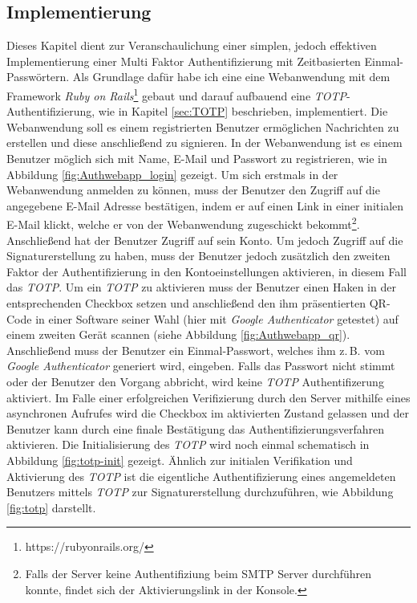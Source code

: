 \documentclass[11pt,a4paper,ngerman]{scrreprt}
\begin{document}
\subsection{Implementierung}\label{sec:TOTPImpl}
Dieses Kapitel dient zur Veranschaulichung einer simplen, jedoch effektiven Implementierung einer Multi Faktor Authentifizierung mit Zeitbasierten Einmal-Passwörtern. Als Grundlage dafür habe ich eine eine Webanwendung mit dem Framework \textit{Ruby on Rails}\footnote{https://rubyonrails.org/} gebaut und darauf aufbauend eine \textit{TOTP}-Authentifizierung, wie in Kapitel \ref{sec:TOTP} beschrieben, implementiert. Die Webanwendung soll es einem registrierten Benutzer ermöglichen Nachrichten zu erstellen und diese anschließend zu signieren. In der Webanwendung ist es einem Benutzer möglich sich mit Name, E-Mail und Passwort zu registrieren, wie in Abbildung \ref{fig:Authwebapp_login} gezeigt. Um sich erstmals in der Webanwendung anmelden zu können, muss der Benutzer den Zugriff auf die angegebene E-Mail Adresse bestätigen, indem er auf einen Link in einer initialen E-Mail klickt, welche er von der Webanwendung zugeschickt bekommt\footnote{Falls der Server keine Authentifiziung beim SMTP Server durchführen konnte, findet sich der Aktivierungslink in der Konsole.}. Anschließend hat der Benutzer Zugriff auf sein Konto. Um jedoch Zugriff auf die Signaturerstellung zu haben, muss der Benutzer jedoch zusätzlich den zweiten Faktor der Authentifizierung in den Kontoeinstellungen aktivieren, in diesem Fall das \textit{TOTP}. Um ein \textit{TOTP} zu aktivieren muss der Benutzer einen Haken in der entsprechenden Checkbox setzen und anschließend den ihm präsentierten QR-Code in einer Software seiner Wahl (hier mit \textit{Google Authenticator} getestet) auf einem zweiten Gerät scannen (siehe Abbildung \ref{fig:Authwebapp_qr}). Anschließend muss der Benutzer ein Einmal-Passwort, welches ihm z.\,B. vom \textit{Google Authenticator} generiert wird, eingeben. Falls das Passwort nicht stimmt oder der Benutzer den Vorgang abbricht, wird keine \textit{TOTP} Authentifizerung aktiviert. Im Falle einer erfolgreichen Verifizierung durch den Server mithilfe eines asynchronen Aufrufes wird die Checkbox im aktivierten Zustand gelassen und der Benutzer kann durch eine finale Bestätigung das Authentifizierungsverfahren aktivieren. Die Initialisierung des \textit{TOTP} wird noch einmal schematisch in Abbildung \ref{fig:totp-init} gezeigt. Ähnlich zur initialen Verifikation und Aktivierung des \textit{TOTP} ist die eigentliche Authentifizierung eines angemeldeten Benutzers mittels \textit{TOTP} zur Signaturerstellung durchzuführen, wie Abbildung \ref{fig:totp} darstellt.
\end{document}
